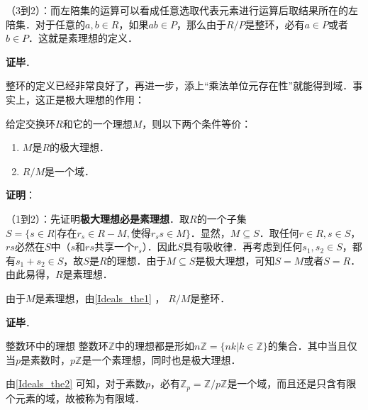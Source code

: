 （3到2）：而左陪集的运算可以看成任意选取代表元素进行运算后取结果所在的左陪集．对于任意的$a, b\in R$，如果$ab\in P$，那么由于$R/P$是整环，必有$a\in P$或者$b\in P$．这就是素理想的定义．

\textbf{证毕}．

整环的定义已经非常良好了，再进一步，添上“乘法单位元存在性”就能得到域．事实上，这正是极大理想的作用：

\begin{theorem}{}\label{Ideals_the2}
给定交换环$R$和它的一个理想$M$，则以下两个条件等价：
\begin{enumerate}
\item $M$是$R$的极大理想．
\item $R/M$是一个域．
\end{enumerate}
\end{theorem}

\textbf{证明}：

（1到2）：先证明\textbf{极大理想必是素理想}．取$R$的一个子集$S=\{s\in R|\text{存在} r_s\in R-M, \text{使得}r_ss\in M\}$．显然，$M\subseteq S$．取任何$r\in R, s\in S$，$rs$必然在$S$中（$s$和$rs$共享一个$r_s$）．因此$S$具有吸收律．再考虑到任何$s_1, s_2\in S$，都有$s_1+s_2\in S$，故$S$是$R$的理想．由于$M\subseteq S$是极大理想，可知$S=M$或者$S=R$．由此易得，$R$是素理想．

由于$M$是素理想，由\autoref{Ideals_the1} ， $R/M$是整环．

\textbf{证毕}．


\begin{example}{整数环中的理想}
整数环$\mathbb{Z}$中的理想都是形如$n\mathbb{Z}=\{nk|k\in\mathbb{Z}\}$的集合．其中当且仅当$p$是素数时，$p\mathbb{Z}$是一个素理想，同时也是极大理想．

由\autoref{Ideals_the2} 可知，对于素数$p$，必有$\mathbb{Z}_p=\mathbb{Z}/p\mathbb{Z}$是一个域，而且还是只含有限个元素的域，故被称为有限域．
\end{example}






